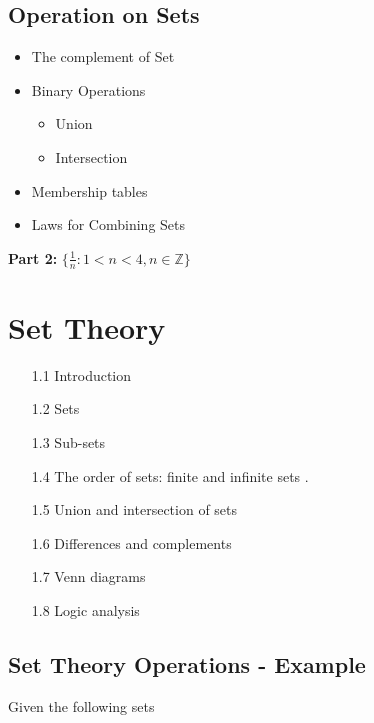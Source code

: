 \subsection*{Operation on Sets}

\begin{itemize}
\item The complement of Set
\item Binary Operations
\begin{itemize}
\item Union
\item Intersection
\end{itemize}
\item Membership tables
\item Laws for Combining Sets
\end{itemize}


\textbf{Part 2:} $ \{ \frac{1}{n}: 1 < n < 4, n \in \mathbb{Z} \} $



\section*{Set Theory}

\begin{itemize}
\item[1.1] Introduction  
\item[1.2] Sets  
\item[1.3] Sub-sets  
\item[1.4] The order of sets: finite and infinite sets .
\item[1.5] Union and intersection of sets  
\item[1.6] Differences and complements  
\item[1.7] Venn diagrams  
\item[1.8] Logic analysis
\end{itemize}  







\subsection{Set Theory Operations - Example}


Given the following sets

